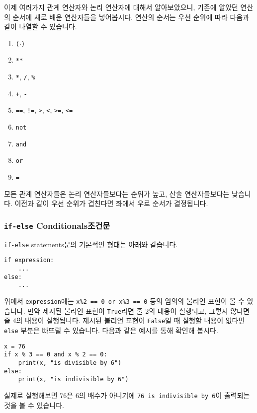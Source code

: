 \documentclass[../main.tex]{subfiles}
\begin{document}
이제 여러가지 관계 연산자와 논리 연산자에 대해서 알아보았으니, 기존에 알았던 연산의 순서에 새로 배운 연산자들을 넣어봅시다.
연산의 순서는 우선 순위에 따라 다음과 같이 나열할 수 있습니다.
\begin{enumerate}
  \item \texttt{($\cdot$)}
  \item \texttt{\texttt{**}}
  \item \texttt{*}, \texttt{/}, \texttt{\%}
  \item \texttt{+}, \texttt{-}
  \item \texttt{==}, \texttt{!=}, \texttt{>}, \texttt{<}, \texttt{>=}, \texttt{<=}
  \item \texttt{not}
  \item \texttt{and}
  \item \texttt{or}
  \item \texttt{=}
\end{enumerate}
모든 관계 연산자들은 논리 연산자들보다는 순위가 높고, 산술 연산자들보다는 낮습니다.
이전과 같이 우선 순위가 겹친다면 좌에서 우로 순서가 결정됩니다.

\subsubsection{\texttt{if-else} Conditionals조건문}
\texttt{if-else} statements문의 기본적인 형태는 아래와 같습니다.
\begin{verbatim}
if expression:
    ...
else:
    ...
\end{verbatim}
위에서 \texttt{expression}에는 \texttt{x\%2 == 0 or x\%3 == 0} 등의 임의의
불리언 표현이 올 수 있습니다.  만약 제시된 불리언 표현이 \texttt{True}라면 줄
2의 내용이 실행되고, 그렇지 않다면 줄 4의 내용이 실행됩니다.  제시된 불리언
표현이 \texttt{False}일 때 실행할 내용이 없다면 \texttt{else} 부분은 빠뜨릴 수
있습니다.
다음과 같은 예시를 통해 확인해 봅시다.
\begin{verbatim}
x = 76
if x % 3 == 0 and x % 2 == 0:
    print(x, "is divisible by 6")
else:
    print(x, "is indivisible by 6")
\end{verbatim}
실제로 실행해보면 76은 6의 배수가 아니기에 \texttt{76 is indivisible by 6}이
출력되는 것을 볼 수 있습니다.
\end{document}
